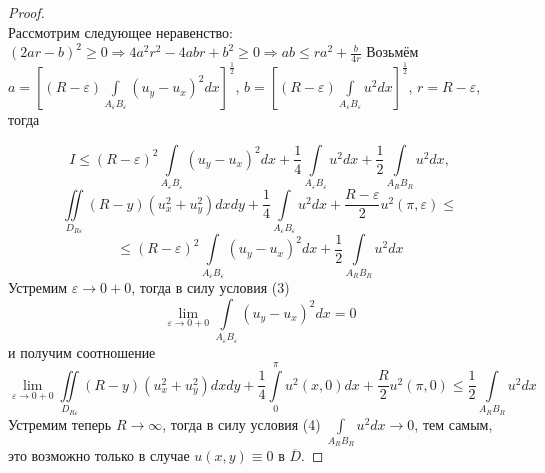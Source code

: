 \documentclass[a4paper, 9pt]{article}
\begin{document}
\begin{proof}
\begin{equation*}
		\end{equation*}
		Рассмотрим следующее неравенство: \begin{math}
			\left(2ar -b\right)^2 \geq 0 \Rightarrow 4a^2 r^2 - 4 abr + b^2 \geq 0 \Rightarrow ab \leq r a^2 + \frac{b}{4r}
		\end{math}
		\newline
		Возьмём $ a = \left[ \left(R - \varepsilon \right) \int\limits_{A_\varepsilon B_\varepsilon} \left( u_y - u_x\right)^2 dx \right]^{\frac12}$, $ b = \left[\left(R - \varepsilon\right)\int\limits_{A_\varepsilon B_\varepsilon} u^2 dx \right]^{\frac12}$, $ r = R - \varepsilon$, тогда
		
		\begin{equation*}
			I \leq \left(R - \varepsilon\right)^2 \int\limits_{A_\varepsilon B_\varepsilon} \left( u_y - u_x\right)^2 dx + \dfrac14 \int\limits_{A_\varepsilon B_\varepsilon} u^2 dx +\dfrac12 \int\limits_{A_RB_R} u^2 dx, 
		\end{equation*}
		\begin{equation*}
			\iint\limits_{D_{R\varepsilon}} \left(R - y\right) \left(u_x^2 + u_y^2\right) dx dy + \dfrac{1}{4}\int\limits_{A_\varepsilon B_\varepsilon} u^2 dx +\dfrac{R - \varepsilon}{2}u^2(\pi, \varepsilon) \leq 
		\end{equation*}
		\begin{equation*}
			\leq \left(R - \varepsilon\right)^2 \int\limits_{A_\varepsilon B_\varepsilon} \left( u_y - u_x\right)^2 dx  +\dfrac12 \int\limits_{A_RB_R} u^2 dx
		\end{equation*}
		Устремим $\varepsilon \to 0 + 0$, тогда в силу условия (3)
		\begin{equation*}
			\lim\limits_{\varepsilon \to 0 + 0} \int\limits_{A_\varepsilon B_\varepsilon} \left(u_y - u_x\right)^2 dx = 0
		\end{equation*}
		и получим соотношение
		\begin{equation*}
			\lim\limits_{\varepsilon \to 0 + 0} \iint\limits_{D_{R\varepsilon}} \left(R - y\right) \left(u_x^2 + u_y^2 \right) dx dy + \dfrac14 \int\limits_0^\pi u^2(x,0) dx + \dfrac{R}{2}u^2(\pi,0) \leq \dfrac12 \int\limits_{A_RB_R} u^2 dx
		\end{equation*}
		Устремим теперь $R \to \infty$, тогда  в силу условия (4) $\int\limits_{A_RB_R} u^2 dx \to 0$, тем самым, это возможно только в случае $u(x,y) \equiv 0$ в $\overline{D}$.
	\end{proof}
	
\end{document}
